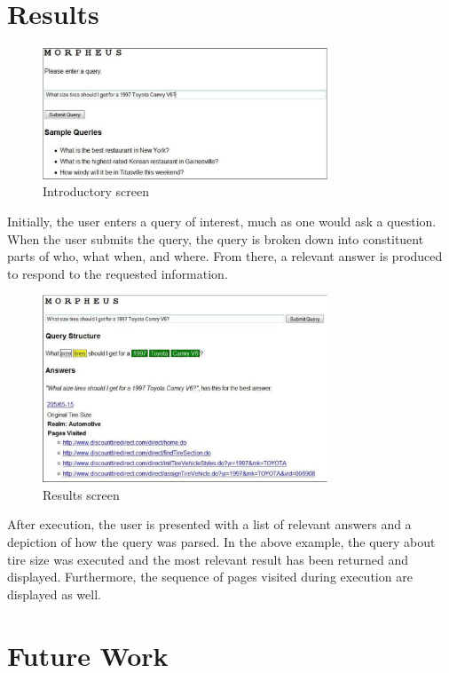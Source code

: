 \section{Results}

\begin{figure}[t]
\centering
\includegraphics[width=85mm]{screen_intro.eps}
\caption{Introductory screen}
\label{fig:screen_intro}
\end{figure}

Initially, the user enters a query of interest, much as one would ask a question. When the user submits the query, the query is broken down into constituent parts of who, what when, and where. From there, a relevant answer is produced to respond to the requested information.

\begin{figure}[t]
\centering
\includegraphics[width=85mm]{screen_result.eps}
\caption{Results screen}
\label{fig:screen_result}
\end{figure}


After execution, the user is presented with a list of relevant answers and a depiction of how the query was parsed. In the above example, the query about tire size was executed and the most relevant result has been returned and displayed. 
Furthermore, the sequence of pages visited during execution are displayed as well. 



\section{Future Work}

